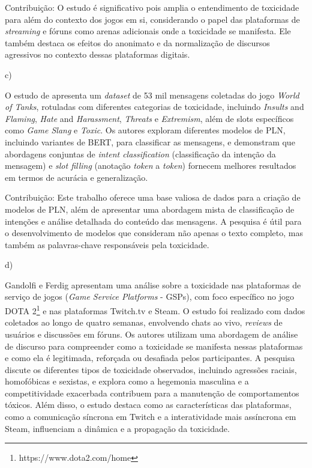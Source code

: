 \documentclass{eic-bcc-tcc}
\begin{document}
Contribuição: O estudo é significativo pois amplia o entendimento de toxicidade para além do contexto dos jogos em si, considerando o papel das plataformas de \textit{streaming} e fóruns como arenas adicionais onde a toxicidade se manifesta. Ele também destaca os efeitos do anonimato e da normalização de discursos agressivos no contexto dessas plataformas digitais.


c) \cite{naseem-etal-2025-gametox}

O estudo de \cite{naseem-etal-2025-gametox} apresenta um \textit{dataset} de 53 mil mensagens coletadas do jogo \textit{World of Tanks}, rotuladas com diferentes categorias de toxicidade, incluindo \textit{Insults} and \textit{Flaming}, \textit{Hate} and \textit{Harassment}, \textit{Threats} e \textit{Extremism}, além de slots específicos como \textit{Game Slang} e \textit{Toxic}. Os autores exploram diferentes modelos de PLN, incluindo variantes de BERT, para classificar as mensagens, e demonstram que abordagens conjuntas de \textit{intent classification} (classificação da intenção da mensagem) e \textit{slot filling} (anotação \textit{token} a \textit{token}) fornecem melhores resultados em termos de acurácia e generalização.

Contribuição: Este trabalho oferece uma base valiosa de dados para a criação de modelos de PLN, além de apresentar uma abordagem mista de classificação de intenções e análise detalhada do conteúdo das mensagens. A pesquisa é útil para o desenvolvimento de modelos que consideram não apenas o texto completo, mas também as palavras-chave responsáveis pela toxicidade.


d) \cite{doi:10.1177/13548565211028809}

Gandolfi e Ferdig  apresentam uma análise sobre a toxicidade nas plataformas de serviço de jogos (\textit{Game Service Platforms} - GSPs), com foco específico no jogo DOTA 2\footnote{https://www.dota2.com/home} e nas plataformas Twitch.tv e Steam. O estudo foi realizado com dados coletados ao longo de quatro semanas, envolvendo chats ao vivo, \textit{reviews} de usuários e discussões em fóruns. Os autores utilizam uma abordagem de análise de discurso para compreender como a toxicidade se manifesta nessas plataformas e como ela é legitimada, reforçada ou desafiada pelos participantes. A pesquisa discute os diferentes tipos de toxicidade observados, incluindo agressões raciais, homofóbicas e sexistas, e explora como a hegemonia masculina e a competitividade exacerbada contribuem para a manutenção de comportamentos tóxicos. Além disso, o estudo destaca como as características das plataformas, como a comunicação síncrona em Twitch e a interatividade mais assíncrona em Steam, influenciam a dinâmica e a propagação da toxicidade.
\end{document}

